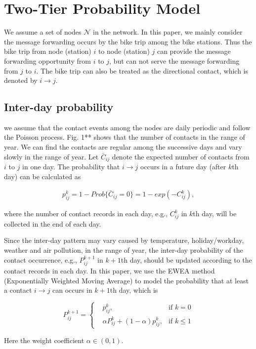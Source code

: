\section{Two-Tier Probability Model}
\label{sec:sysmodel}
We assume a set of nodes $\mathcal{N}$ in the network.
In this paper, we mainly consider the message forwarding occurs by the bike trip among the bike stations.
Thus the bike trip from node (station) $i$ to node (station) $j$ 
can provide the message forwarding opportunity from $i$ to $j$,
but can not serve the message forwarding from $j$ to $i$.
The bike trip can also be treated as the directional contact,
which is denoted by $i \rightarrow j$.

\subsection{Inter-day probability}
we assume that the contact events among the nodes are daily periodic
and follow the Poisson process.
Fig. 1** shows that the number of contacts in the range of year.
We can find the contacts are regular among the successive days
and vary slowly in the range of year.
Let $\bar{C}_{i j}$ denote the expected number of contacts from $i$ to $j$ in one day.
The probability that $i \rightarrow j$ occurs in a future day (after $k$th day) can be calculated as
\begin{small}
\begin{equation}
\begin{aligned}
p^{k}_{i j} = 1 - Prob\{\bar{C}_{i j}=0\} = 1 - exp(-C^{k}_{i j}),
\end{aligned}
\end{equation}
\end{small}
where the number of contact records in each day, e.g., $C^{k}_{i j}$ in $k$th day,
will be collected in the end of each day.

Since the inter-day pattern may vary caused by 
temperature, holiday/workday, weather and air pollution, in the range of year,
the inter-day probability of the contact occurrence, e.g., $P^{k+1}_{i j}$ in $k+1$th day,
should be updated according to the contact records in each day.
In this paper, we use the EWEA method (Exponentially Weighted Moving Average) to
model the probability that at least a contact $i \rightarrow j$ can occurs in $k+1$th day,
which is
\begin{small}
\begin{equation}
P^{k+1}_{i j} =
\left\{
\begin{aligned}
& p^{k}_{i j}, &\text{if  } k = 0 \\
& \alpha P^{k}_{i j} + (1-\alpha) p^{k}_{i j}, &\text{if  } k \le 1
\end{aligned}
\right.
\end{equation}
\end{small}
Here the weight coefficient $\alpha \in (0, 1)$.

